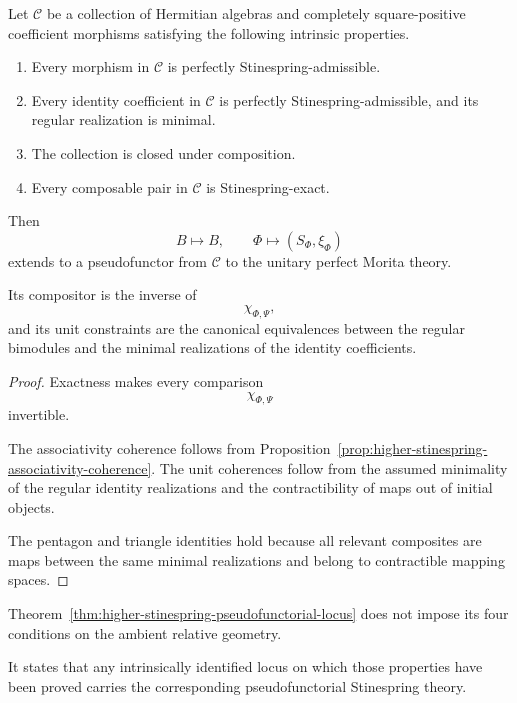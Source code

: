 \begin{theorem}
\label{thm:higher-stinespring-pseudofunctorial-locus}
Let \(\mathscr C\) be a collection of Hermitian algebras and completely
square-positive coefficient morphisms satisfying the following intrinsic
properties.

\begin{enumerate}
  \item Every morphism in \(\mathscr C\) is perfectly
  Stinespring-admissible.

  \item Every identity coefficient in \(\mathscr C\) is perfectly
  Stinespring-admissible, and its regular realization is minimal.

  \item The collection is closed under composition.

  \item Every composable pair in \(\mathscr C\) is Stinespring-exact.
\end{enumerate}

Then
\[
  B\longmapsto B,
  \qquad
  \Phi\longmapsto(S_\Phi,\xi_\Phi)
\]
extends to a pseudofunctor from \(\mathscr C\) to the unitary perfect Morita
theory.

Its compositor is the inverse of
\[
  \chi_{\Phi,\Psi},
\]
and its unit constraints are the canonical equivalences between the regular
bimodules and the minimal realizations of the identity coefficients.
\end{theorem}

\begin{proof}
Exactness makes every comparison
\[
  \chi_{\Phi,\Psi}
\]
invertible.

The associativity coherence follows from
Proposition~\ref{prop:higher-stinespring-associativity-coherence}. The unit
coherences follow from the assumed minimality of the regular identity
realizations and the contractibility of maps out of initial objects.

The pentagon and triangle identities hold because all relevant composites are
maps between the same minimal realizations and belong to contractible mapping
spaces.
\end{proof}

\begin{remark}
\label{rem:higher-pseudofunctor-conditional}
Theorem~\ref{thm:higher-stinespring-pseudofunctorial-locus} does not impose its
four conditions on the ambient relative geometry.

It states that any intrinsically identified locus on which those properties
have been proved carries the corresponding pseudofunctorial Stinespring
theory.
\end{remark}

